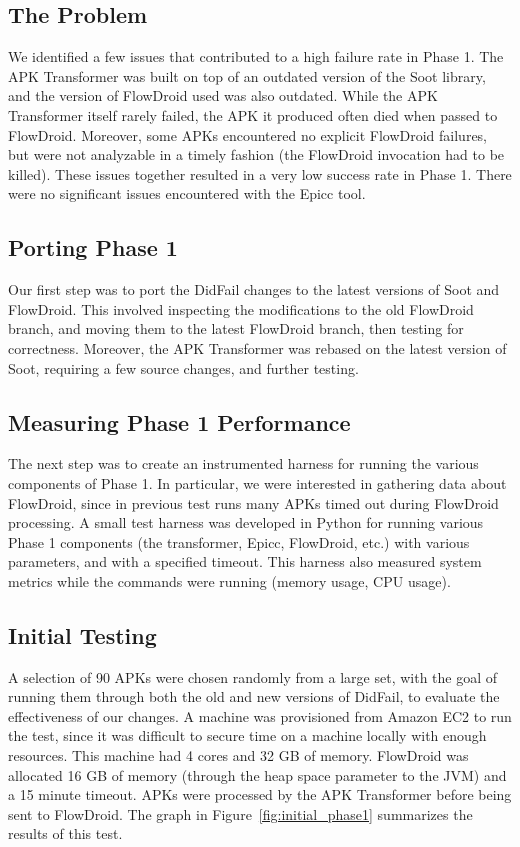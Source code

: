 \subsection{The Problem}
We identified a few issues that contributed to a high failure rate in Phase 1.  The APK Transformer was built on top of an outdated version of the Soot library, and the version of FlowDroid used was also outdated.  While the APK Transformer itself rarely failed, the APK it produced often died when passed to FlowDroid.  Moreover, some APKs encountered no explicit FlowDroid failures, but were not analyzable in a timely fashion (the FlowDroid invocation had to be killed).   These issues together resulted in a very low success rate in Phase 1.  There were no significant issues encountered with the Epicc tool.

\subsection{Porting Phase 1}
Our first step was to port the DidFail changes to the latest versions of Soot and FlowDroid.  This involved inspecting the modifications to the old FlowDroid branch, and moving them to the latest FlowDroid branch, then testing for correctness.  Moreover, the APK Transformer was rebased on the latest version of Soot, requiring a few source changes, and further testing.

\subsection{Measuring Phase 1 Performance}
The next step was to create an instrumented harness for running the various components of Phase 1.  In particular, we were interested in gathering data about FlowDroid, since in previous test runs many APKs timed out during FlowDroid processing.  A small test harness was developed in Python for running various Phase 1 components (the transformer, Epicc, FlowDroid, etc.) with various parameters, and with a specified timeout.  This harness also measured system metrics while the commands were running (memory usage, CPU usage).  

\subsection{Initial Testing}
A selection of 90 APKs were chosen randomly from a large set, with the goal of running them through both the old and new versions of DidFail, to evaluate the effectiveness of our changes.  A machine was provisioned from Amazon EC2 to run the test, since it was difficult to secure time on a machine locally with enough resources.  This machine had 4 cores and 32 GB of memory.  FlowDroid was allocated 16 GB of memory (through the heap space parameter to the JVM) and a 15 minute timeout.  APKs were processed by the APK Transformer before being sent to FlowDroid.  The graph in Figure~\ref{fig:initial_phase1} summarizes the results of this test.

